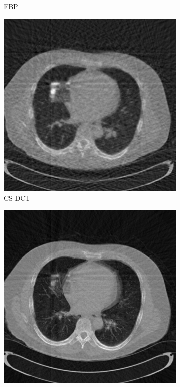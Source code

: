 \documentclass{article}
\begin{document}
\begin{figure}[h]
\begin{subfigure}[b]{0.3\linewidth}
        \caption{FBP}
    \end{subfigure}
    \begin{subfigure}[b]{0.3\linewidth}
        \includegraphics[width=\textwidth]{../images/supplementary/colon/60_angles/cs_dct.png}
        \caption{CS-DCT}
     \end{subfigure}
    \begin{subfigure}[b]{0.3\linewidth}
        \includegraphics[width=\textwidth]{../images/supplementary/colon/60_angles/plain_pca.png}

\end{subfigure}
\end{figure}
\end{document}

